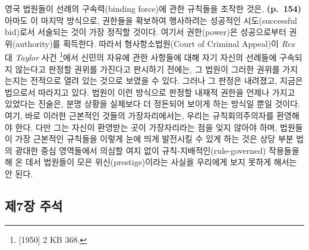 영국 법원들이 선례의 구속력(binding force)에 관한 규칙들을 조작한 것은,
\textbf{(p.~154)} 아마도 이 마지막 방식으로, 권한들을 확보하여
행사하려는 성공적인 시도(successful bid)로서 서술되는 것이 가장 정직할
것이다. 여기서 권한(power)은 성공으로부터  권위(authority)를 획득한다. 따라서 형사항소법원(Court of
Criminal Appeal)이 \emph{Rex} 대 \emph{Taylor} 사건 \footnote{{[}1950{]}
  2 KB 368.}에서 신민의 자유에 관한 사항들에 대해 자기 자신의 선례들에
구속되지 않는다고 판정할 권위를 가진다고 판시하기 전에는, 그 법원이
그러한 권위를 가지는지는 전적으로 열려 있는 것으로 보였을 수 있다.
그러나 그 판정은 내려졌고, 지금은 법으로서 따라지고 있다. 법원이 이런
방식으로 판정할 내재적 권한을 언제나 가지고 있었다는 진술은, 분명 상황을
실제보다 더 정돈되어 보이게 하는 방식일 뿐일 것이다. 여기, 바로 이러한
근본적인 것들의 가장자리에서는, 우리는 규칙회의주의자를 환영해야 한다.
다만 그는 자신이 환영받는 곳이 가장자리라는 점을 잊지 않아야 하며,
법원들이 가장 근본적인 규칙들을 이렇게 눈에 띄게 발전시킬 수 있게 하는
것은 상당 부분 법의 광대한 중심 영역들에서 의심할 여지 없이
규칙-지배적인(rule-governed) 작용들을 해 온 데서 법원들이 모은
위신(prestige)이라는 사실을 우리에게 보지 못하게 해서는 안 된다.

\newpage

\subsection{제7장 주석}\label{uxc81c7uxc7a5-uxc8fcuxc11d}


